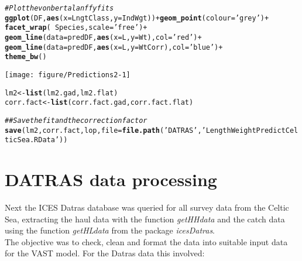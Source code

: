 \documentclass[12pt]{article}\usepackage[]{graphicx}\usepackage[]{color}
\makeatletter
\def\maxwidth{ %
  \ifdim\Gin@nat@width>\linewidth
    \linewidth
  \else
    \Gin@nat@width
  \fi
}
\newcommand{\hlstr}[1]{\textcolor[rgb]{0.192,0.494,0.8}{#1}}%
\newcommand{\hlcom}[1]{\textcolor[rgb]{0.678,0.584,0.686}{\textit{#1}}}%
\newcommand{\hlopt}[1]{\textcolor[rgb]{0,0,0}{#1}}%
\newcommand{\hlstd}[1]{\textcolor[rgb]{0.345,0.345,0.345}{#1}}%
\newcommand{\hlkwb}[1]{\textcolor[rgb]{0.69,0.353,0.396}{#1}}%
\newcommand{\hlkwc}[1]{\textcolor[rgb]{0.333,0.667,0.333}{#1}}%
\newcommand{\hlkwd}[1]{\textcolor[rgb]{0.737,0.353,0.396}{\textbf{#1}}}%
\newenvironment{kframe}{%
 \def\at@end@of@kframe{}%
 \ifinner\ifhmode%
  \def\at@end@of@kframe{\end{minipage}}%
  \begin{minipage}{\columnwidth}%
 \fi\fi%
 \def\FrameCommand##1{\hskip\@totalleftmargin \hskip-\fboxsep
 \colorbox{shadecolor}{##1}\hskip-\fboxsep
     \hskip-\linewidth \hskip-\@totalleftmargin \hskip\columnwidth}%
 \MakeFramed {\advance\hsize-\width
   \@totalleftmargin\z@ \linewidth\hsize
   \@setminipage}}%
 {\par\unskip\endMakeFramed%
 \at@end@of@kframe}
\newenvironment{knitrout}{}{} %
\makeatother
\begin{document}
\begin{knitrout}
\begin{kframe}
\begin{alltt}
\hlcom{# Plot the von bertalanffy fits}
\hlkwd{ggplot}\hlstd{(DF,} \hlkwd{aes}\hlstd{(}\hlkwc{x} \hlstd{= LngtClass,} \hlkwc{y} \hlstd{= IndWgt))} \hlopt{+} \hlkwd{geom_point}\hlstd{(}\hlkwc{colour} \hlstd{=} \hlstr{'grey'}\hlstd{)} \hlopt{+}
        \hlkwd{facet_wrap}\hlstd{(}\hlopt{~} \hlstd{Species,} \hlkwc{scale} \hlstd{=} \hlstr{'free'}\hlstd{)} \hlopt{+}
        \hlkwd{geom_line}\hlstd{(}\hlkwc{data} \hlstd{= predDF,} \hlkwd{aes}\hlstd{(}\hlkwc{x} \hlstd{= L,} \hlkwc{y} \hlstd{= Wt),} \hlkwc{col} \hlstd{=} \hlstr{'red'}\hlstd{)} \hlopt{+}
        \hlkwd{geom_line}\hlstd{(}\hlkwc{data} \hlstd{= predDF,} \hlkwd{aes}\hlstd{(}\hlkwc{x} \hlstd{= L,} \hlkwc{y} \hlstd{= WtCorr),} \hlkwc{col} \hlstd{=} \hlstr{'blue'}\hlstd{)} \hlopt{+}
        \hlkwd{theme_bw}\hlstd{()}
\end{alltt}
\end{kframe}
\texttt{[image: figure/Predictions2-1]} 
\begin{kframe}\begin{alltt}
\hlstd{lm2} \hlkwb{<-} \hlkwd{list}\hlstd{(lm2.gad, lm2.flat)}
\hlstd{corr.fact} \hlkwb{<-} \hlkwd{list}\hlstd{(corr.fact.gad, corr.fact.flat)}

\hlcom{## Save the fit and the correction factor}
\hlkwd{save}\hlstd{(lm2, corr.fact, lop,} \hlkwc{file} \hlstd{=} \hlkwd{file.path}\hlstd{(}\hlstr{'DATRAS'}\hlstd{,}\hlstr{'LengthWeightPredictCelticSea.RData'}\hlstd{))}
\end{alltt}
\end{kframe}
\end{knitrout}

\section{DATRAS data processing}

Next the ICES Datras database was queried for all survey data from the Celtic
Sea, extracting the haul data with the function \textit{getHHdata} and the
catch data using the function \textit{getHLdata} from the package
\textit{icesDatras}. \\

The objective was to check, clean and format the data into suitable input data
for the VAST model. For the Datras data this involved:
\end{document}
